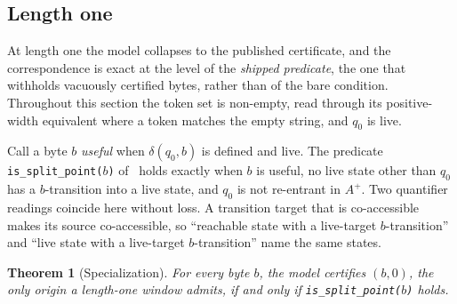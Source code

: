 \documentclass[11pt,a4paper]{article}
\theoremstyle{definition}
\theoremstyle{plain}
\newtheorem{theorem}{Theorem}
\newcommand{\code}[1]{\texttt{#1}}
\begin{document}
\subsection{Length one}
\label{sec:length-one}

At length one the model collapses to the published certificate, and the correspondence is exact at the level of the
\emph{shipped predicate}, the one that withholds vacuously certified bytes, rather than of the bare condition.
Throughout this section the token set is non-empty, read through its positive-width equivalent where a token matches the
empty string, and $q_0$ is live.

Call a byte $b$ \emph{useful} when $\delta(q_0, b)$ is defined and live. The predicate \code{is\_split\_point($b$)}
of~\cite{nidhogg2026splitpoints} holds exactly when $b$ is useful, no live state other than $q_0$ has a $b$-transition
into a live state, and $q_0$ is not re-entrant in $A^+$. Two quantifier readings coincide here without loss. A
transition target that is co-accessible makes its source co-accessible, so ``reachable state with a live-target
$b$-transition'' and ``live state with a live-target $b$-transition'' name the same states.

\begin{theorem}[Specialization]
\label{thm:specialization}
For every byte $b$, the model certifies $(b, 0)$, the only origin a length-one window admits, if and only if
\code{is\_split\_point($b$)} holds.
\end{theorem}
\end{document}
